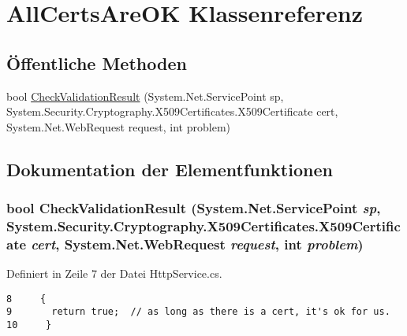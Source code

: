 \hypertarget{classQbeSAS_1_1AllCertsAreOK}{
\section{All\-Certs\-Are\-OK Klassenreferenz}
\label{classQbeSAS_1_1AllCertsAreOK}
}
\subsection*{\"{O}ffentliche Methoden}
\begin{CompactItemize}
\item 
bool \hyperlink{classQbeSAS_1_1AllCertsAreOK_QbeSAS_1_1AllCertsAreOKa0}{Check\-Validation\-Result} (System.Net.Service\-Point sp, System.Security.Cryptography.X509Certificates.X509Certificate cert, System.Net.Web\-Request request, int problem)
\end{CompactItemize}


\subsection{Dokumentation der Elementfunktionen}
\hypertarget{classQbeSAS_1_1AllCertsAreOK_QbeSAS_1_1AllCertsAreOKa0}{
\subsubsection[CheckValidationResult]{\setlength{\rightskip}{0pt plus 5cm}bool Check\-Validation\-Result (System.Net.Service\-Point {\em sp}, System.Security.Cryptography.X509Certificates.X509Certificate {\em cert}, System.Net.Web\-Request {\em request}, int {\em problem})}}
\label{classQbeSAS_1_1AllCertsAreOK_QbeSAS_1_1AllCertsAreOKa0}




Definiert in Zeile 7 der Datei Http\-Service.cs.



\footnotesize\begin{verbatim}8     {
9       return true;  // as long as there is a cert, it's ok for us.
10     }
\end{verbatim}\normalsize 
